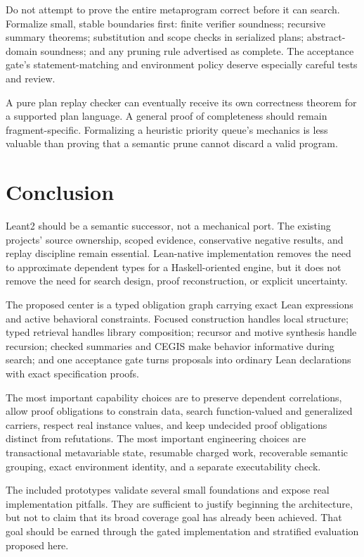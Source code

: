 \documentclass[11pt,letterpaper]{article}
\theoremstyle{definition}
\theoremstyle{remark}
\begin{document}
Do not attempt to prove the entire metaprogram correct before it can search. Formalize small, stable boundaries first: finite verifier soundness; recursive summary theorems; substitution and scope checks in serialized plans; abstract-domain soundness; and any pruning rule advertised as complete. The acceptance gate's statement-matching and environment policy deserve especially careful tests and review.

A pure plan replay checker can eventually receive its own correctness theorem for a supported plan language. A general proof of completeness should remain fragment-specific. Formalizing a heuristic priority queue's mechanics is less valuable than proving that a semantic prune cannot discard a valid program.

\section{Conclusion}

Leant2 should be a semantic successor, not a mechanical port. The existing projects' source ownership, scoped evidence, conservative negative results, and replay discipline remain essential. Lean-native implementation removes the need to approximate dependent types for a Haskell-oriented engine, but it does not remove the need for search design, proof reconstruction, or explicit uncertainty.

The proposed center is a typed obligation graph carrying exact Lean expressions and active behavioral constraints. Focused construction handles local structure; typed retrieval handles library composition; recursor and motive synthesis handle recursion; checked summaries and CEGIS make behavior informative during search; and one acceptance gate turns proposals into ordinary Lean declarations with exact specification proofs.

The most important capability choices are to preserve dependent correlations, allow proof obligations to constrain data, search function-valued and generalized carriers, respect real instance values, and keep undecided proof obligations distinct from refutations. The most important engineering choices are transactional metavariable state, resumable charged work, recoverable semantic grouping, exact environment identity, and a separate executability check.

The included prototypes validate several small foundations and expose real implementation pitfalls. They are sufficient to justify beginning the architecture, but not to claim that its broad coverage goal has already been achieved. That goal should be earned through the gated implementation and stratified evaluation proposed here.
\end{document}

